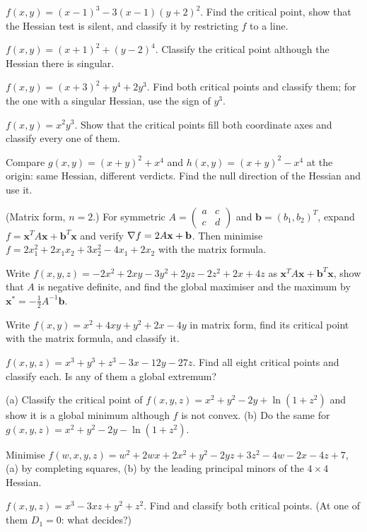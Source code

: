 \begin{problems}
    \item $f(x, y) = (x - 1)^3 - 3 (x - 1)(y + 2)^2$. Find the critical point, show that the Hessian test is silent, and classify it by restricting $f$ to a line.
    \item $f(x, y) = (x + 1)^2 + (y - 2)^4$. Classify the critical point although the Hessian there is singular.
    \item $f(x, y) = (x + 3)^2 + y^4 + 2 y^3$. Find both critical points and classify them; for the one with a singular Hessian, use the sign of $y^3$.
    \item $f(x, y) = x^2 y^3$. Show that the critical points fill both coordinate axes and classify every one of them.
    \item Compare $g(x, y) = (x + y)^2 + x^4$ and $h(x, y) = (x + y)^2 - x^4$ at the origin: same Hessian, different verdicts. Find the null direction of the Hessian and use it.
    \item (Matrix form, $n = 2$.) For symmetric $A = \begin{pmatrix} a & c \\ c & d \end{pmatrix}$ and $\mathbf{b} = (b_1, b_2)^T$, expand $f = \mathbf{x}^T A \mathbf{x} + \mathbf{b}^T \mathbf{x}$ and verify $\nabla f = 2 A \mathbf{x} + \mathbf{b}$. Then minimise $f = 2 x_1^2 + 2 x_1 x_2 + 3 x_2^2 - 4 x_1 + 2 x_2$ with the matrix formula.
    \item Write $f(x, y, z) = -2 x^2 + 2 x y - 3 y^2 + 2 y z - 2 z^2 + 2 x + 4 z$ as $\mathbf{x}^T A \mathbf{x} + \mathbf{b}^T \mathbf{x}$, show that $A$ is negative definite, and find the global maximiser and the maximum by $\mathbf{x}^* = -\tfrac12 A^{-1} \mathbf{b}$.
    \item Write $f(x, y) = x^2 + 4 x y + y^2 + 2 x - 4 y$ in matrix form, find its critical point with the matrix formula, and classify it.
    \item $f(x, y, z) = x^3 + y^3 + z^3 - 3 x - 12 y - 27 z$. Find all eight critical points and classify each. Is any of them a global extremum?
    \item (a) Classify the critical point of $f(x, y, z) = x^2 + y^2 - 2 y + \ln(1 + z^2)$ and show it is a global minimum although $f$ is not convex. (b) Do the same for $g(x, y, z) = x^2 + y^2 - 2 y - \ln(1 + z^2)$.
    \item Minimise $f(w, x, y, z) = w^2 + 2 w x + 2 x^2 + y^2 - 2 y z + 3 z^2 - 4 w - 2 x - 4 z + 7$, (a) by completing squares, (b) by the leading principal minors of the $4 \times 4$ Hessian.
    \item $f(x, y, z) = x^3 - 3 x z + y^2 + z^2$. Find and classify both critical points. (At one of them $D_1 = 0$: what decides?)

\end{problems}
